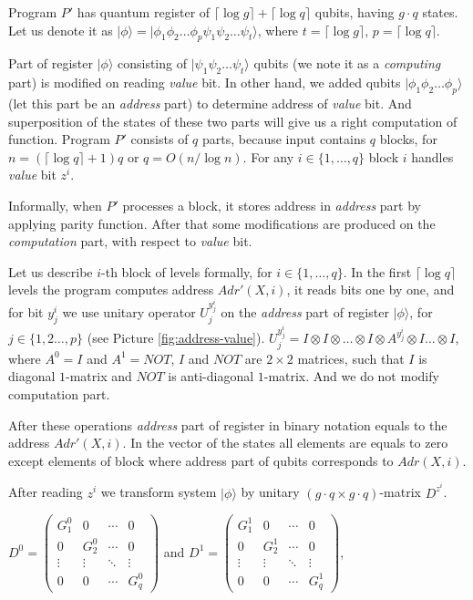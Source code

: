 \documentclass{llncs}
\newcommand{\ket}[1]{|#1\rangle}
\begin{document}
Program $P'$ has quantum register of $\lceil \log{g} \rceil + \lceil \log{q} \rceil$ qubits, having $g \cdot q$ states. Let us denote it as $\ket\phi = \ket {\phi_1 \phi_2 \ldots \phi_p \psi_1 \psi_2 \ldots \psi_t}$, where $t=\lceil \log{g} \rceil$, $p=\lceil \log{q} \rceil$. 

Part of register $\ket\phi$ consisting of  $\ket{\psi_1 \psi_2 \ldots \psi_t}$ qubits (we note it as a {\em computing} part) is modified on reading {\em value} bit. In other hand, we added qubits $\ket{\phi_1 \phi_2 \ldots \phi_p }$ (let this part be an {\em address} part) to determine address of {\em value} bit. And superposition of the states of these two parts will give us a right computation of function. 
Program $P'$ consists of $q$ parts, because input contains $q$ blocks, for $n=(\lceil\log q\rceil+1)q$ or $q= O( n/\log{n})$. For any $i \in \{1,\dots,q\}$ block $i$ handles {\em value} bit $z^i$.

Informally, when $P'$ processes a block, it stores address in {\em address} part by applying parity function. After that some modifications are produced on the {\em computation} part, with respect to {\em value} bit. 

Let us describe $i$-th block of levels formally, for $i\in\{1,\dots,q\}$. In the first $\lceil \log q \rceil$ levels the program computes address $Adr'(X,i)$, it reads bits one by one, and for bit $y_j^i$  we use unitary operator $U^{y^i_j}_j$ on the {\em address} part of register $\ket\phi$, for $j \in \{1,2 \ldots, p\}$ (see Picture \ref{fig:address-value}). $U^{y^i_j}_j=I \otimes I \otimes \ldots \otimes I \otimes A^{y^i_j} \otimes I \ldots \otimes I $, where $A^{0}=I$ and $A^{1}=NOT$, $I$ and $NOT$ are $2\times 2$ matrices, such that $I$ is diagonal $1$-matrix and $NOT$ is anti-diagonal $1$-matrix. And we do not modify {computation} part. 

After these operations {\em address} part of register in binary notation equals to the address $Adr'(X,i)$. In the vector of the states all elements are equals to zero except elements of block where address part of qubits corresponds to $Adr(X,i)$. 

After reading $z^i$ we transform system  $\ket\phi$ by unitary $(g\cdot q \times g\cdot q)$-matrix $D^{z^i}$.

$D^0 = \begin{pmatrix}
G_1^0 & 0 & \cdots & 0 \\
0 & G_2^0 & \cdots & 0 \\         
\vdots & \vdots & \ddots & \vdots \\
0 & 0 & \cdots & G_q^0
\end{pmatrix}$ and
$D^1 = \begin{pmatrix}
G_1^1 & 0 & \cdots & 0 \\
0 & G_2^1 & \cdots & 0 \\         
\vdots & \vdots & \ddots & \vdots \\
0 & 0 & \cdots & G_q^1
\end{pmatrix}$,
\end{document}
